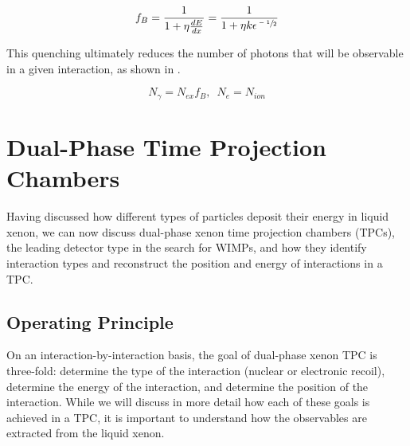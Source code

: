 \begin{equation}
        \label{eqn:birks_quenching}
        f_B = \frac{1}{1 + \eta \frac{dE}{dx}} = \frac{1}{1 + \eta k \epsilon^{\sfrac{-1}{2}}}
\end{equation}

This quenching ultimately reduces the number of photons that will be observable in a given interaction, as shown in .

\begin{equation}
        \label{eqn:nr_observables}
        N_{\gamma} = N_{ex} f_B, \, \, \, N_e = N_{ion}
\end{equation}




\section{Dual-Phase Time Projection Chambers}
\label{sec:lxe_tpc}

Having discussed how different types of particles deposit their energy in liquid xenon, we can now discuss dual-phase xenon time projection chambers (TPCs), the leading detector type in the search for WIMPs, and how they identify interaction types and reconstruct the position and energy of interactions in a TPC.



\subsection{Operating Principle}
\label{sec:tpc_operating_principle}

On an interaction-by-interaction basis, the goal of dual-phase xenon TPC is three-fold: determine the type of the interaction (nuclear or electronic recoil), determine the energy of the interaction, and determine the position of the interaction.  While we will discuss in more detail how each of these goals is achieved in a TPC, it is important to understand how the observables are extracted from the liquid xenon.  

